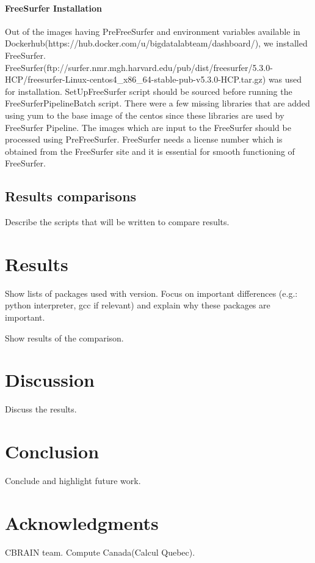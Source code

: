 \documentclass{article}
\begin{document}
\paragraph{FreeSurfer Installation}
Out of the images having PreFreeSurfer and environment variables available in Dockerhub(https://hub.docker.com/u/bigdatalabteam/dashboard/), we installed FreeSurfer. FreeSurfer(ftp://surfer.nmr.mgh.harvard.edu/pub/dist/freesurfer/5.3.0-HCP/freesurfer-Linux-centos4\_x86\_64-stable-pub-v5.3.0-HCP.tar.gz) was used for installation. SetUpFreeSurfer script should be sourced before running the FreeSurferPipelineBatch script. There were a few missing libraries that are added using yum to the base image of the centos since these libraries are used by FreeSurfer Pipeline. The images which are input to the FreeSurfer should be processed using PreFreeSurfer. FreeSurfer needs a license number which is obtained from the FreeSurfer site and it is essential for smooth functioning of FreeSurfer. 

\subsection{Results comparisons}

Describe the scripts that will be written to compare results.

\section{Results}

Show lists of packages used with version. Focus on important
differences (e.g.: python interpreter, gcc if relevant) and explain
why these packages are important.

Show results of the comparison.

\section{Discussion}

Discuss the results.

\section{Conclusion}

Conclude and highlight future work.

\section{Acknowledgments}

CBRAIN team. Compute Canada(Calcul Quebec).



\end{document}
